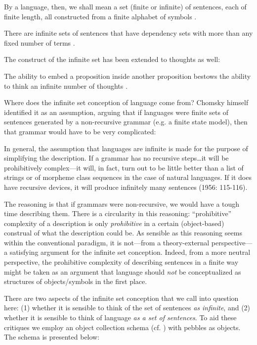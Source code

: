 By a language, then, we shall mean a set (finite or infinite) of sentences, each of finite length, all constructed from a finite alphabet of symbols \citep[114]{Chomsky1956}.

There are infinite sets of sentences that have dependency sets with more than any fixed number of terms \citep[115]{Chomsky1956}. 

The construct of the infinite set has been extended to thoughts as well:

The ability to embed a proposition inside another proposition bestows the ability to think an infinite number of thoughts \citep[125]{Pinker1999}. 

  Where does the infinite set conception of language come from? Chomsky himself identified it as an assumption, arguing that if languages were finite sets of sentences generated by a non-recursive grammar (e.g. a finite state model), then that grammar would have to be very complicated:

In general, the assumption that languages are infinite is made for the purpose of simplifying the description. If a grammar has no recursive steps…it will be prohibitively complex—it will, in fact, turn out to be little better than a list of strings or of morpheme class sequences in the case of natural languages. If it does have recursive devices, it will produce infinitely many sentences (1956: 115-116).

  The reasoning is that if grammars were non-recursive, we would have a tough time describing them. There is a circularity in this reasoning: “prohibitive” complexity of a description is only \textit{prohibitive} in a certain (object-based) construal of what the description could be. As sensible as this reasoning seems within the conventional paradigm, it is not—from a theory-external perspective—a satisfying argument for the infinite set conception. Indeed, from a more neutral perspective, the prohibitive complexity of describing sentences in a finite way might be taken as an argument that language should \textit{not} be conceptualized as structures of objects/symbols in the first place.

  There are two aspects of the infinite set conception that we call into question here: 
  (1) whether it is sensible to think of the set of sentences \textit{as infinite}, and 
  (2) whether it is sensible to think of language \textit{as a set of sentences}. To aid these critiques we employ an object collection schema (cf. \citealt{LakoffNúñez2000}) with pebbles as objects. The schema is presented below: 

